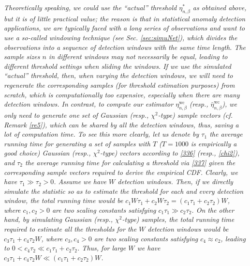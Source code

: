 \documentclass[10pt, twocolumn]{IEEEtran}
\begin{document}
\begin{rem} \label{re6} \emph{Theoretically speaking, we could use the
    ``actual'' threshold $\eta^{*}_{n,\beta}$ as obtained above, but it
    is of little practical value; the reason is that in statistical
    anomaly detection applications, we are typically faced with a long
    series of observations and want to use a so-called \emph{windowing
      technique} (see Sec. \ref{sec:simuNet}), which divides the
    observations into a sequence of detection windows with the same time
    length. The sample sizes $n$ in different windows may not
    necessarily be equal, leading to different threshold settings when
    sliding the windows. If we use the simulated ``actual'' threshold,
    then, when varying the detection windows, we will need to regenerate
    the corresponding samples (for threshold estimation purposes) from
    scratch, which is computationally too expensive, especially when
    there are many detection windows. In contrast, to compute our
    estimator $\eta_{n,\beta}^{\text{wc}}$ (resp., $\bar
    \eta_{n,\beta}^{\text{wc}}$), we only need to generate one set of
    Gaussian (resp., $\chi^2$-type) sample vectors (cf. Remark
    \ref{re5}), which can be shared by all the detection windows, thus,
    saving a lot of computation time. To see this more clearly, let us
    denote by $\tau_1$ the average running time for generating a set of
    samples with $T$ ($T = 1000$ is empirically a good choice) Gaussian
    (resp., $\chi^2$-type) vectors according to \eqref{336} (resp.,
    \eqref{chi2}), and $\tau_2$ the average running time for calculating
    a threshold via \eqref{337} given the corresponding sample vectors
    required to derive the empirical CDF. Clearly, we have $\tau_1 \gg
    \tau_2 > 0$. Assume we have $W$ detection windows. Then, if we
    directly simulate the statistic so as to estimate the threshold for
    each and every detection window, the total running time would be
    $c_1W\tau_1 + c_2W\tau_2 = (c_1\tau_1 + c_2\tau_2) W$, where $c_1,
    c_2 > 0$ are two scaling constants satisfying $c_1\tau_1 \gg
    c_2\tau_2$. On the other hand, by simulating Gaussian (resp.,
    $\chi^2$-type) samples, the total running time required to estimate
    all the thresholds for the $W$ detection windows would be $c_3\tau_1
    + c_4\tau_2W$, where $c_3, c_4 > 0$ are two scaling constants
    satisfying $c_4 \approx c_2$, leading to $0 < c_4\tau_2 \ll
    c_1\tau_1 + c_2\tau_2$. Thus, for large $W$ we have $c_3\tau_1 +
    c_4\tau_2W \ll (c_1\tau_1 + c_2\tau_2) W$.}
\end{rem}
\end{document}
